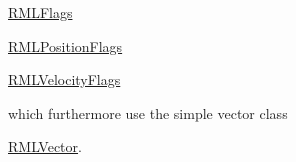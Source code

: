 \begin{DoxyItemize}
\begin{DoxyItemize}
\begin{DoxyItemize}
\end{DoxyItemize}
\item \mbox{\hyperlink{classRMLFlags}{R\+M\+L\+Flags}}~\newline
~\newline
 
\begin{DoxyItemize}
\item \mbox{\hyperlink{classRMLPositionFlags}{R\+M\+L\+Position\+Flags}} 
\item \mbox{\hyperlink{classRMLVelocityFlags}{R\+M\+L\+Velocity\+Flags}}~\newline
~\newline
 
\end{DoxyItemize}
\end{DoxyItemize}
\end{DoxyItemize}

which furthermore use the simple vector class~\newline
~\newline

\begin{DoxyItemize}
\item \mbox{\hyperlink{classRMLVector}{R\+M\+L\+Vector}}.~\newline
~\newline

\end{DoxyItemize}